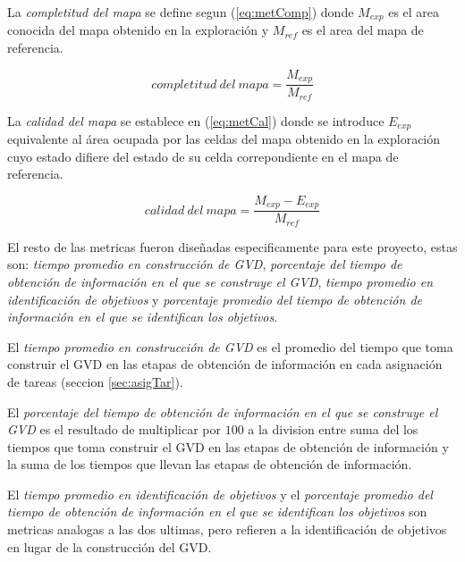 
La \emph{completitud del mapa} se define segun (\ref{eq:metComp}) donde
$M_{exp}$ es el area conocida del mapa obtenido en la exploración y $M_{ref}$
es el area del mapa de referencia.

\begin{equation} \label{eq:metComp}
completitud\ del\ mapa = \frac{M_{exp}}{M_{ref}}
\end{equation}

La \emph{calidad del mapa} se establece en (\ref{eq:metCal}) donde se introduce
$E_{exp}$ equivalente al área ocupada por las celdas del mapa obtenido en
la exploración cuyo estado difiere del estado de su celda correpondiente en el
mapa de referencia.

\begin{equation} \label{eq:metCal}
calidad\ del\ mapa = \frac{M_{exp}-E_{exp}}{M_{ref}}
\end{equation}

El resto de las metricas fueron diseñadas especificamente para
este proyecto, estas son: \emph{tiempo promedio en construcción de GVD}, \emph{porcentaje
del tiempo de obtención de información en el que se construye el GVD}, \emph{tiempo
promedio en identificación de objetivos} y \emph{porcentaje promedio del tiempo de
obtención de información en el que se identifican los objetivos}.

El \emph{tiempo promedio en construcción de GVD} es el promedio del tiempo que
toma construir el GVD en las etapas de obtención de información en cada
asignación de tareas (seccion \ref{sec:asigTar}).

El \emph{porcentaje del tiempo de obtención de información en el que se
construye el GVD} es el resultado de multiplicar por $100$ a la division entre
suma del los tiempos que toma construir el GVD en las etapas de obtención de
información y la suma de los tiempos que llevan las etapas de obtención de
información.

El \emph{tiempo promedio en identificación de objetivos} y el \emph{porcentaje
promedio del tiempo de obtención de información en el que se identifican los
objetivos} son metricas analogas a las dos ultimas, pero refieren a la
identificación de objetivos en lugar de la construcción del GVD.

